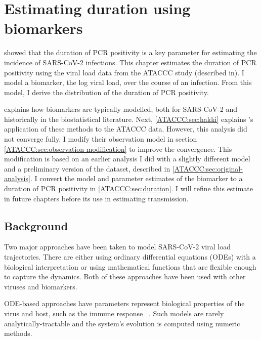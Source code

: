 \documentclass[thesis.tex]{subfiles}
\begin{document}
\ifSubfilesClassLoaded{
  \setcounter{chapter}{3}
}

\chapter{Estimating duration using biomarkers} \label{ATACCC}

 showed that the duration of PCR positivity is a key parameter for estimating the incidence of SARS-CoV-2 infections.
This chapter estimates the duration of PCR positivity using the viral load data from the ATACCC study (described in).
I model a biomarker, the log viral load, over the course of an infection.
From this model, I derive the distribution of the duration of PCR positivity.

 explains how biomarkers are typically modelled, both for SARS-CoV-2 and historically in the biostatistical literature.
Next, \cref{ATACCC:sec:hakki} explains \textcite{hakkiOnset}'s application of these methods to the ATACCC data.
However, this analysis did not converge fully.
I modify their observation model in section \cref{ATACCC:sec:observation-modification} to improve the convergence.
This modification is based on an earlier analysis I did with a slightly different model and a preliminary version of the dataset, described in \cref{ATACCC:sec:original-analysis}.
I convert the model and parameter estimates of the biomarker to a duration of PCR positivity in \cref{ATACCC:sec:duration}.
I will refine this estimate in future chapters before its use in estimating transmission.

\section{Background} \label{ATACCC:sec:background}

Two major approaches have been taken to model SARS-CoV-2 viral load trajectories.
There are either using ordinary differential equations (ODEs) with a biological interpretation or using mathematical functions that are flexible enough to capture the dynamics.
Both of these approaches have been used with other viruses and biomarkers.

ODE-based approaches have parameters represent biological properties of the virus and host, such as the immune response ~\autocites[e.g.:][]{ejimaEstimation,keVivo,kimQuantitative,goncalvesTiming,perelsonMechanistic}.
Such models are rarely analytically-tractable and the system's evolution is computed using numeric methods.
\end{document}
